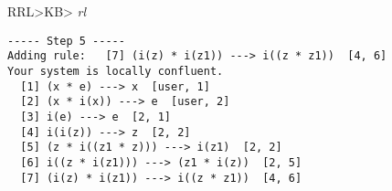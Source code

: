 RRL>KB> {\em rl}
\begin{verbatim}
----- Step 5 -----
Adding rule:   [7] (i(z) * i(z1)) ---> i((z * z1))  [4, 6]
Your system is locally confluent.
  [1] (x * e) ---> x  [user, 1]
  [2] (x * i(x)) ---> e  [user, 2]
  [3] i(e) ---> e  [2, 1]
  [4] i(i(z)) ---> z  [2, 2]
  [5] (z * i((z1 * z))) ---> i(z1)  [2, 2]
  [6] i((z * i(z1))) ---> (z1 * i(z))  [2, 5]
  [7] (i(z) * i(z1)) ---> i((z * z1))  [4, 6]
\end{verbatim}
\rm
\normalsize
